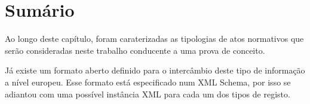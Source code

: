 \section{Sumário}

Ao longo deste capítulo, foram caraterizadas as tipologias de atos normativos que serão 
consideradas neste trabalho conducente a uma prova de conceito.

Já existe um formato aberto definido para o intercâmbio deste tipo de informação a nível europeu.
Esse formato está especificado num XML Schema, por isso se adiantou com uma possível
instância XML para cada um dos tipos de registo.

